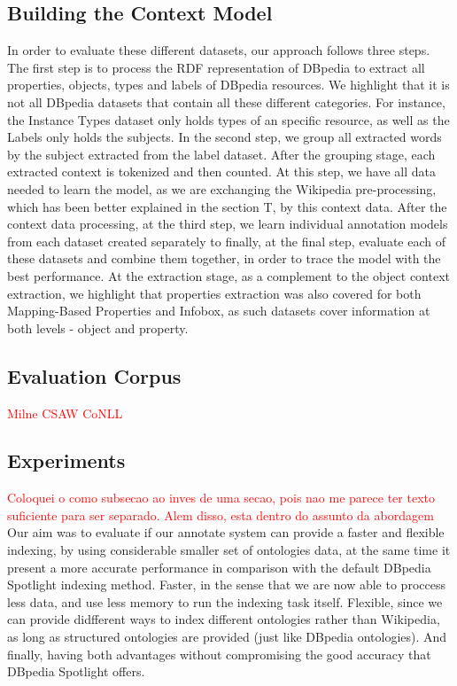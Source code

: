 \documentclass[10pt,a4paper]{article}
\begin{document}
\subsection{Building the Context Model}

In order to evaluate these different datasets, our approach follows three steps. The first step is to process the RDF representation of DBpedia to extract all properties, objects, types and labels of DBpedia resources. We highlight that it is not all DBpedia datasets that contain all these different categories. For instance, the Instance Types dataset only holds types of an specific resource, as well as the Labels only holds the subjects. In the second step, we group all extracted words by the subject extracted from the label dataset.
After the grouping stage, each extracted context is tokenized and then counted. At this step, we have all data needed to learn the model, as we are exchanging the Wikipedia pre-processing, which has been better explained in the section T, by this context data. After the context data processing, at the third step, we learn individual annotation models from each dataset created separately to finally, at the final step, evaluate each of these datasets and combine them together, in order to trace the model with the best performance.
At the extraction stage, as a complement to the object context extraction, we highlight that properties extraction was also covered for both Mapping-Based Properties and Infobox, as such datasets cover information at both levels - object and property.


\subsection{Evaluation Corpus}


\textcolor{red}{Milne CSAW CoNLL}

\subsection{Experiments}

\textcolor{red}{Coloquei o como subsecao ao inves de uma secao, pois nao me parece ter texto suficiente para ser separado. Alem disso, esta dentro do assunto da abordagem}
Our aim was to evaluate if our annotate system can provide a faster and flexible indexing, by using considerable smaller set of ontologies data, at the same time it present a more accurate performance in comparison with the default DBpedia Spotlight indexing method. Faster, in the sense that  we are  now able to proccess less data, and use less memory to run the indexing task itself. Flexible, since we can provide didfferent ways to index different ontologies rather than Wikipedia, as long as structured ontologies are provided (just like DBpedia ontologies). And finally, having both advantages without compromising the good accuracy that DBpedia Spotlight offers.
\end{document}
